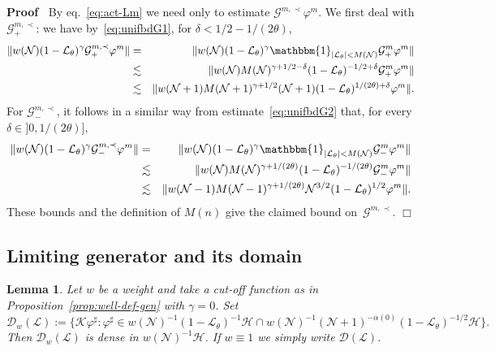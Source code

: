 \documentclass[10pt]{article}
\newcommand{\assign}{:=}
\newenvironment{proof}{\noindent\textbf{Proof\ }}{\hspace*{\fill}$\Box$\medskip}
\newtheorem{lemma}{Lemma}
\begin{document}
\begin{proof}
  By eq.~{\eqref{eq:act-Lm}} we need only to estimate $\mathcal{G}^{m, \prec}
  \varphi^m$. We first deal with $\mathcal{G}_+^{m, \prec}$: we have
  by~{\eqref{eq:unifbdG1}}, for $\delta < 1 / 2 - 1 / (2 \theta)$,
  \begin{eqnarray*}
    \| w (\mathcal{N}) (1 -\mathcal{L}_{\theta})^{\gamma} \mathcal{G}_+^{m,
    \prec} \varphi^m \| & = & \| w (\mathcal{N}) (1
    -\mathcal{L}_{\theta})^{\gamma} \mathbbm{1}_{| \mathcal{L}_{\theta} | < M
    (\mathcal{N})} \mathcal{G}_+^m \varphi^m \|\\
    & \lesssim & \| w (\mathcal{N}) M (\mathcal{N})^{\gamma + 1 / 2 - \delta}
    (1 -\mathcal{L}_{\theta})^{- 1 / 2 + \delta} \mathcal{G}_+^m \varphi^m
    \|\\
    & \lesssim & \| w (\mathcal{N}+ 1) M (\mathcal{N}+ 1)^{\gamma + 1 / 2}
    (\mathcal{N}+ 1) (1 -\mathcal{L}_{\theta})^{1 / (2 \theta) + \delta}
    \varphi^m \| .
  \end{eqnarray*}
  For $\mathcal{G}_-^{m, \prec}$, it follows in a similar way from
  estimate~{\eqref{eq:unifbdG2}} that, for every $\delta \in] 0, 1 / (2
  \theta)]$,
  \begin{eqnarray*}
    \| w (\mathcal{N}) (1 -\mathcal{L}_{\theta})^{\gamma} \mathcal{G}_-^{m,
    \prec} \varphi^m \| & = & \| w (\mathcal{N}) (1
    -\mathcal{L}_{\theta})^{\gamma} \mathbbm{1}_{| \mathcal{L}_{\theta} | < M
    (\mathcal{N})} \mathcal{G}_-^m \varphi^m \|\\
    & \lesssim & \| w (\mathcal{N}) M (\mathcal{N})^{\gamma + 1 / (2 \theta)}
    (1 -\mathcal{L}_{\theta})^{- 1 / (2 \theta)} \mathcal{G}_-^m \varphi^m
    \|\\
    & \lesssim & \| w (\mathcal{N}- 1) M (\mathcal{N}- 1)^{\gamma + 1 / (2
    \theta)} \mathcal{N}^{3 / 2} (1 -\mathcal{L}_{\theta})^{1 / 2} \varphi^m
    \| .
  \end{eqnarray*}
  These bounds and the definition of $M (n)$ give the claimed bound
  on~$\mathcal{G}^{m, \prec}$.
\end{proof}

\subsection{Limiting generator and its domain}

\begin{lemma}
  \label{lem:density}Let $w$ be a weight and take a cut-off function as in
  Proposition~\ref{prop:well-def-gen} with $\gamma = 0$. Set
  \[ \mathcal{D}_w (\mathcal{L}) \assign \{ \mathcal{K} \varphi^{\sharp} :
     \varphi^{\sharp} \in w (\mathcal{N})^{- 1} (1 -\mathcal{L}_{\theta})^{-
     1} \mathcal{H} \cap w (\mathcal{N})^{- 1} (\mathcal{N}+ 1)^{- \alpha (0)}
     (1 -\mathcal{L}_{\theta})^{- 1 / 2} \mathcal{H} \} . \]
  Then $\mathcal{D}_w (\mathcal{L})$ is dense in $w (\mathcal{N})^{- 1}
  \mathcal{H}$. If $w \equiv 1$ we simply write $\mathcal{D} (\mathcal{L})$.
\end{lemma}
\end{document}
